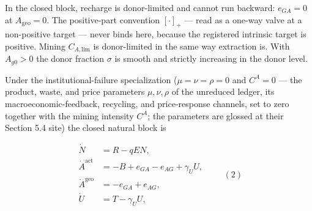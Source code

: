 \documentclass[11pt]{article}
\begin{document}
In the closed block, recharge is donor-limited and cannot run backward: \(e_{GA}=0\) at \(A_{\mathrm{geo}}=0\). The positive-part convention \([\cdot]_+\) --- read as a one-way valve at a non-positive target --- never binds here, because the registered intrinsic target is positive. Mining \(C_{A,\mathrm{lim}}\) is donor-limited in the same way extraction is. With \(A_{g0}>0\) the donor fraction \(\sigma\) is smooth and strictly increasing in the donor level.

Under the institutional-failure specialization (\(\mu = \nu = \rho = 0\) and \(C^A = 0\) --- the product, waste, and price parameters \(\mu, \nu, \rho\) of the unreduced ledger, its macroeconomic-feedback, recycling, and price-response channels, set to zero together with the mining intensity \(C^A\); the parameters are glossed at their Section 5.4 site) the closed natural block is 

$$\begin{aligned} \dot N &= R - qEN, \\ \dot A^{\mathrm{act}} &= -B + e_{GA} - e_{AG} + \gamma_U U, \\ \dot A^{\mathrm{geo}} &= -e_{GA} + e_{AG}, \\ \dot U &= T - \gamma_U U, \end{aligned} \qquad (2)$$
\end{document}
